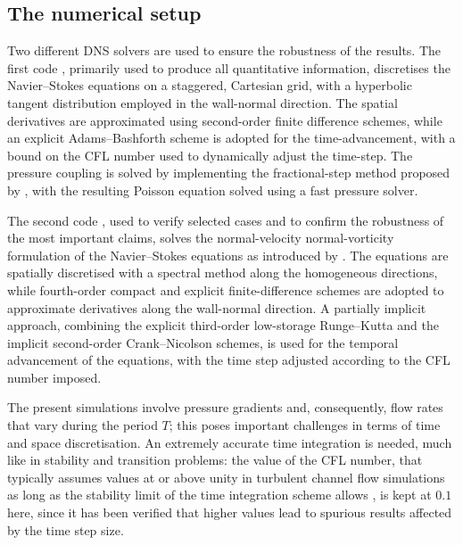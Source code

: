\documentclass[lineno]{jfm}
\begin{document}
\subsection{The numerical setup}

Two different DNS solvers are used to ensure the robustness of the results. 
The first code \citep{mazzino-rosti-2021}, primarily used to produce all quantitative information, discretises the Navier--Stokes equations on a staggered, Cartesian grid, with a hyperbolic tangent distribution employed in the wall-normal direction.
The spatial derivatives are approximated using second-order finite difference schemes, while an explicit Adams--Bashforth scheme is adopted for the 
time-advancement, with a bound on the CFL number used to dynamically adjust the time-step. The pressure coupling is solved by implementing the fractional-step method proposed by \citet{kim-moin-1985}, with the resulting Poisson equation solved using a fast 
pressure solver. 

The second code \citep{luchini-quadrio-2006}, used to verify selected cases and to confirm the robustness of the most important claims, solves the normal-velocity normal-vorticity formulation of the Navier--Stokes equations as introduced by \cite{kim-moin-moser-1987}.
The equations are spatially discretised with a spectral method along the 
homogeneous directions, while fourth-order compact and explicit finite-difference schemes are adopted to approximate derivatives along the wall-normal direction.
A partially implicit approach, combining the explicit third-order low-storage 
Runge--Kutta and the implicit second-order Crank--Nicolson schemes, is used for the
temporal advancement of the equations, with the time step adjusted according to the 
CFL number imposed.

The present simulations involve pressure gradients and, consequently, flow rates 
that vary during the period $T$; this poses important challenges in terms of time and space discretisation. 
An extremely accurate time integration is needed, much like in stability and 
transition problems: the value of the CFL number, that typically assumes values at or above unity in turbulent channel flow simulations as long as the stability limit of the time integration scheme allows \citep{choi-moin-1994}, is kept at $0.1$ here, since it has been verified that higher values lead to spurious results affected by the time step size.
\end{document}
